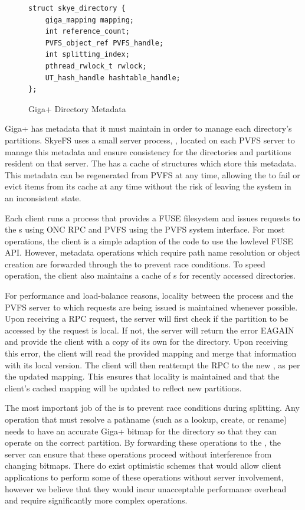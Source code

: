 \documentclass[onecolumn, 11pt, letterpaper]{article}
\begin{document}
\begin{figure}
\begin{lstlisting}
struct skye_directory {
    giga_mapping mapping;
    int reference_count;
    PVFS_object_ref PVFS_handle;
    int splitting_index;
    pthread_rwlock_t rwlock;
    UT_hash_handle hashtable_handle;
};
\end{lstlisting}
\caption{Giga+ Directory Metadata}
\label{fig:skyedir}
\end{figure}

Giga+ has metadata that it must maintain in order to manage each directory's
partitions.  SkyeFS uses a small server process, , located
on each PVFS server to manage this metadata and ensure consistency for the
directories and partitions resident on that server.  The 
has a cache of  structures which store this metadata.
This metadata can be regenerated from PVFS at any time, allowing the
 to fail or evict items from its cache at any time without
the risk of leaving the system in an inconsistent state.

Each client runs a  process that provides a FUSE filesystem
and issues requests to the s using ONC RPC and PVFS using
the PVFS system interface.\cite{rpc}  For most operations, the client is a simple
adaption of the  code to use the lowlevel FUSE API.  However,
metadata operations which require path name resolution or object creation are
forwarded through the  to prevent race conditions.  To
speed operation, the client also maintains a cache of s
for recently accessed directories.

For performance and load-balance reasons, locality between the
 process and the PVFS server to which 
requests are being issued is maintained whenever possible.  Upon receiving a RPC request, the
server will first check if the partition to be accessed by the
request is local.  If not, the server will return the error EAGAIN and provide
the client with a copy of its own  for the directory.  Upon receiving
this error, the client will read the provided mapping and merge that
information with its local version.  The client will then reattempt the RPC
to the new , as per the updated mapping.  This
ensures that locality is maintained and that the client's cached mapping
will be updated to reflect new partitions.

The most important job of the  is to prevent race
conditions during splitting.  Any operation that must resolve a pathname (such
as a lookup, create, or rename) needs to have an accurate Giga+ bitmap for the
directory so that they can operate on the correct partition.  By forwarding
these operations to the , the server can ensure that these
operations proceed 
without interference from changing bitmaps.  There do exist optimistic schemes that would
allow client applications to perform some of these operations without server
involvement, however we believe that they would incur unacceptable performance
overhead and require significantly more complex operations.
\end{document}

